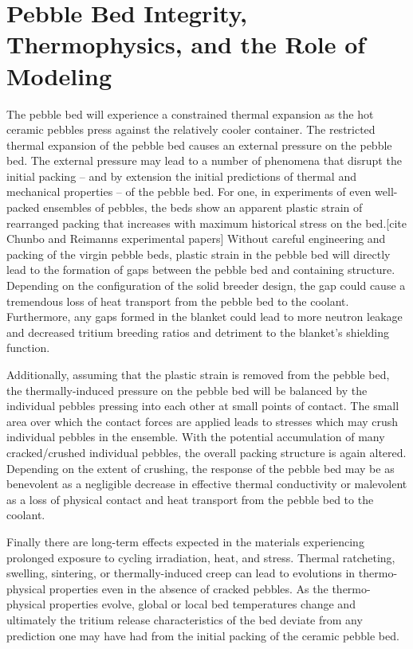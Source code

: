 \section{Pebble Bed Integrity, Thermophysics, and the Role of Modeling}\label{sec:intro-bed-integrity}

The pebble bed will experience a constrained thermal expansion as the hot ceramic pebbles press against the relatively cooler container. The restricted thermal expansion of the pebble bed causes an external pressure on the pebble bed. The external pressure may lead to a number of phenomena that disrupt the initial packing -- and by extension the initial predictions of thermal and mechanical properties -- of the pebble bed. For one, in experiments of even well-packed ensembles of pebbles, the beds show an apparent plastic strain of rearranged packing that increases with maximum historical stress on the bed.[cite Chunbo and Reimanns experimental papers] Without careful engineering and packing of the virgin pebble beds, plastic strain in the pebble bed will directly lead to the formation of gaps between the pebble bed and containing structure. Depending on the configuration of the solid breeder design, the gap could cause a tremendous loss of heat transport from the pebble bed to the coolant. Furthermore, any gaps formed in the blanket could lead to more neutron leakage and decreased tritium breeding ratios and detriment to the blanket's shielding function.

Additionally, assuming that the plastic strain is removed from the pebble bed, the thermally-induced pressure on the pebble bed will be balanced by the individual pebbles pressing into each other at small points of contact. The small area over which the contact forces are applied leads to stresses which may crush individual pebbles in the ensemble. With the potential accumulation of many cracked/crushed individual pebbles, the overall packing structure is again altered. Depending on the extent of crushing, the response of the pebble bed may be as benevolent as a negligible decrease in effective thermal conductivity or malevolent as a loss of physical contact and heat transport from the pebble bed to the coolant. 

Finally there are long-term effects expected in the materials experiencing prolonged exposure to cycling irradiation, heat, and stress. Thermal ratcheting, swelling, sintering, or thermally-induced creep can lead to evolutions in thermo-physical properties even in the absence of cracked pebbles. As the thermo-physical properties evolve, global or local bed temperatures change and ultimately the tritium release characteristics of the bed deviate from any prediction one may have had from the initial packing of the ceramic pebble bed. 

